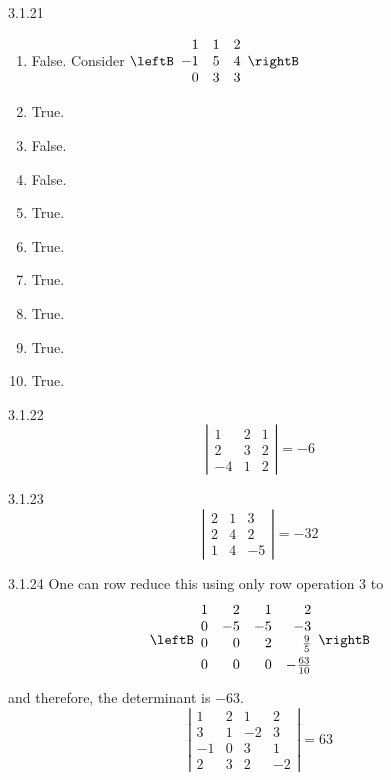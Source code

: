 \begin{Answer}{3.1.21}
\begin{enumerate}
\item False. Consider $\leftB
\begin{array}{rrr}
1 & 1 & 2 \\
-1 & 5 & 4 \\
0 & 3 & 3
\end{array}
\rightB $
\item True.
\item False.
\item False.
\item True.
\item True.
\item True.
\item True.
\item True.
\item True.
\end{enumerate}
\end{Answer}
\begin{Answer}{3.1.22}
\[
\left|
\begin{array}{rrr}
1 & 2 & 1 \\
2 & 3 & 2 \\
-4 & 1 & 2
\end{array}
\right| = -6
\]
\end{Answer}
\begin{Answer}{3.1.23}
\[
\left|
\begin{array}{rrr}
2 & 1 & 3 \\
2 & 4 & 2 \\
1 & 4 & -5
\end{array}
\right| = -32
\]
\end{Answer}
\begin{Answer}{3.1.24}
One can row reduce this using only row operation 3 to
\[
\leftB
\begin{array}{rrrr}
1 & 2 & 1 & 2 \\
0 & -5 & -5 & -3 \\
0 & 0 & 2 & \vspace{0.05in}\frac{9}{5} \\
0 & 0 & 0 & -\vspace{0.05in}\frac{63}{10}
\end{array}
\rightB
\]
and therefore, the determinant is $-63.$
\[
\left|
\begin{array}{rrrr}
1 & 2 & 1 & 2 \\
3 & 1 & -2 & 3 \\
-1 & 0 & 3 & 1 \\
2 & 3 & 2 & -2
\end{array}
\right| = 63
\]
\end{Answer}

